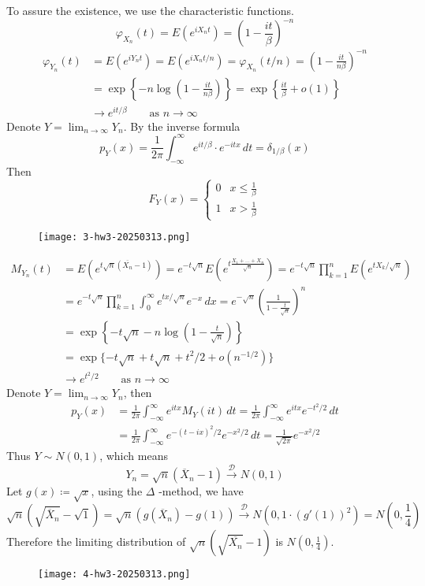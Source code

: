 To assure the existence, we use the characteristic functions.
\[
\varphi_{X_n}(t)=E(e^{ iX_nt })=\left( 1-\frac{it}{\beta} \right)^{-n}
\]
\[
\begin{aligned}
\varphi_{Y_n}(t) & =E(e^{ iY_nt })=E(e^{ iX_nt/n  })=\varphi_{X_n}(t/n )=\left( 1-\frac{it}{n\beta} \right)^{-n} \\
 & =\exp \left\{  -n\log\left( 1-\frac{it}{n\beta} \right)  \right\}=\exp \left\{  \frac{it}{\beta}+o(1)  \right\} \\
 & \to e^{ it/\beta } \qquad \text{as }n\to \infty
\end{aligned}
\]
Denote $Y=\lim_{ n \to \infty }Y_n$.
By the inverse formula
\[
p_{Y}(x)=\frac{1}{2\pi} \int_{-\infty}^{\infty} e^{ it/\beta }\cdot e^{ -itx } \, dt=\delta_{1/\beta}(x)
\]
Then
\[
F_{Y}(x)=\begin{cases}
0 & x\leq \frac{1}{\beta} \\
1 & x> \frac{1}{\beta}  
\end{cases}
\]
\begin{figure}[H]
\centering
\texttt{[image: 3-hw3-20250313.png]}
\label{}
\end{figure}
\[
\begin{aligned}
M_{Y_n}(t) & =E(e^{t \sqrt{ n }(\overline{X_n}-1) })=e^{ -t\sqrt{ n } }E\left( e^{t \frac{X_1+\dots+X_n}{\sqrt{ n }} } \right) =e^{ -t\sqrt{ n } }\prod_{k=1}^{n} E(e^{ tX_k/\sqrt{ n } }) \\
 & =e^{ -t\sqrt{ n } }\prod_{k=1}^{n} \int_{0}^{\infty} e^{ tx/\sqrt{ n } }e^{ -x } \, dx =e^{ -\sqrt{ n } }\left( \frac{1}{1-\frac{t}{\sqrt{ n }} }  \right)^{n} \\
 & =\exp \left\{  -t\sqrt{ n }-n\log\left( 1-\frac{t}{\sqrt{ n }}  \right)  \right\} \\
 & =\exp \{ -t\sqrt{ n }+t\sqrt{ n }+t^{2}/2+o(n^{-1/2 })\} \\
 & \to e^{ t^{2}/2 }\qquad \text{as }n\to \infty
\end{aligned}
\]
Denote $Y=\lim_{ n \to \infty }Y_n$, then
\[
\begin{aligned}
p_{Y}(x) & =\frac{1}{2\pi}\int_{-\infty}^{\infty} e^{ itx }M_{Y}(it) \, dt =\frac{1}{2\pi}\int_{-\infty}^{\infty} e^{ itx }e^{ -t^{2}/2  } \, dt  \\
 & =\frac{1}{2\pi}\int_{-\infty}^{\infty} e^{ -(t-ix)^{2}/2  }e^{ -x^{2}/2 } \, dt=\frac{1}{\sqrt{ 2\pi }}e^{ -x^{2}/2 }
\end{aligned}
\]
Thus $Y\sim N(0,1)$, which means
\[
Y_n=\sqrt{ n }(\overline{X}_n-1)\overset{ \mathcal{D} }{ \to }N(0,1)
\]
Let $g(x)\coloneqq \sqrt{ x }$, using the $\Delta$ -method, we have
\[
\sqrt{ n }(\sqrt{ \overline{X}_n }-\sqrt{ 1 })=\sqrt{ n }(g(\overline{X}_n)-g(1))\overset{ \mathcal{D} }{ \to }N(0,1\cdot(g'(1))^{2})=N\left( 0,\frac{1}{4} \right)
\]
Therefore the limiting distribution of $\sqrt{ n }(\sqrt{ \overline{X_n} }-1)$ is $N\left( 0,\frac{1}{4} \right)$.
\begin{figure}[H]
\centering
\texttt{[image: 4-hw3-20250313.png]}
\label{}
\end{figure}

